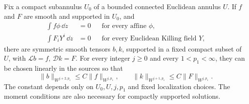 \begin{lemma}\label{four:end:compact-inverses}
Fix a compact subannulus \(U_0\) of a bounded connected Euclidean annulus
\(U\). If \(f\) and \(F\) are smooth and supported in \(U_0\), and
\begin{equation}\label{four:end:compatibility}
 \begin{aligned}
 \int f\phi\,\dd z&=0 &&\text{for every affine }\phi,\\
 \int F_iY^i\,\dd z&=0 &&\text{for every Euclidean Killing field }Y,
 \end{aligned}
\end{equation}
there are symmetric smooth tensors \(b,k\), supported in a fixed compact
subset of \(U\), with \(\mathcal Lb=f\), \(\mathcal Dk=F\).
For every integer \(j\ge0\) and every \(1<p_1<\infty\), they can be
chosen linearly in the sources so that
\begin{equation}\label{four:end:inverse-bounds}
 \|b\|_{W^{j+2,p_1}}\le C\|f\|_{W^{j,p_1}},\qquad
 \|k\|_{W^{j+1,p_1}}\le C\|F\|_{W^{j,p_1}}.
\end{equation}
The constant depends only on \(U_0,U,j,p_1\) and fixed localization
choices. The moment conditions are also necessary for compactly
supported solutions.
\end{lemma}

